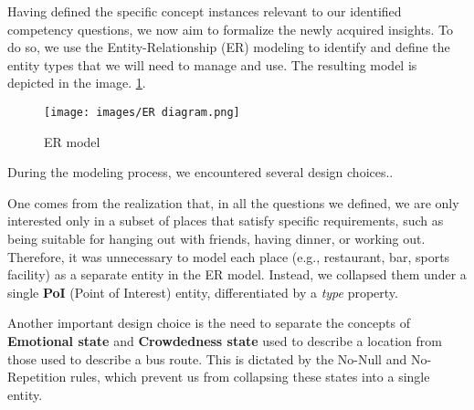 Having defined the specific concept instances relevant to our identified competency questions, we now aim to formalize the newly acquired insights. 
To do so, we use the Entity-Relationship (ER) modeling to identify and define the entity types that we will need to manage and use.
The resulting model is depicted in the image. \ref{fig:ER-model}.

\begin{figure}
    \centering
    \texttt{[image: images/ER diagram.png]}
    \caption{ER model}
    \label{fig:ER-model}
\end{figure}

During the modeling process, we encountered several design choices.. 

One comes from the realization that, in all the questions we defined, we are only interested only in a subset of places that satisfy specific requirements, such as being suitable for hanging out with friends, having dinner, or working out. 
Therefore, it was unnecessary to model each place (e.g., restaurant, bar, sports facility) as a separate entity in the ER model.
Instead, we collapsed them under a single \textbf{PoI} (Point of Interest) entity, differentiated by a \textit{type} property.

Another important design choice is the need to separate the concepts of \textbf{Emotional state} and \textbf{Crowdedness state} used to describe a location from those used to describe a bus route.
This is dictated by the No-Null and No-Repetition rules, which prevent us from collapsing these states into a single entity.


